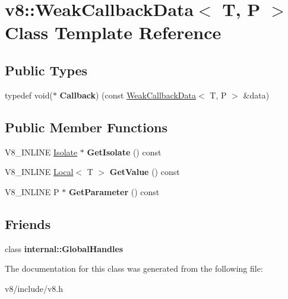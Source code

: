 \hypertarget{classv8_1_1WeakCallbackData}{}\section{v8\+:\+:Weak\+Callback\+Data$<$ T, P $>$ Class Template Reference}
\label{classv8_1_1WeakCallbackData}
\subsection*{Public Types}
\begin{DoxyCompactItemize}
\item 
\hypertarget{classv8_1_1WeakCallbackData_a08a29122f54c663fc2442d8f42c08ac2}{}typedef void($\ast$ {\bfseries Callback}) (const \hyperlink{classv8_1_1WeakCallbackData}{Weak\+Callback\+Data}$<$ T, P $>$ \&data)\label{classv8_1_1WeakCallbackData_a08a29122f54c663fc2442d8f42c08ac2}

\end{DoxyCompactItemize}
\subsection*{Public Member Functions}
\begin{DoxyCompactItemize}
\item 
\hypertarget{classv8_1_1WeakCallbackData_a499a971756182b5b52c28e506339c6b9}{}V8\+\_\+\+I\+N\+L\+I\+N\+E \hyperlink{classv8_1_1Isolate}{Isolate} $\ast$ {\bfseries Get\+Isolate} () const \label{classv8_1_1WeakCallbackData_a499a971756182b5b52c28e506339c6b9}

\item 
\hypertarget{classv8_1_1WeakCallbackData_a0e8fcf0091132c96d548ac319284710a}{}V8\+\_\+\+I\+N\+L\+I\+N\+E \hyperlink{classv8_1_1Local}{Local}$<$ T $>$ {\bfseries Get\+Value} () const \label{classv8_1_1WeakCallbackData_a0e8fcf0091132c96d548ac319284710a}

\item 
\hypertarget{classv8_1_1WeakCallbackData_a96ce7e1fbbfd56d0709225623517ff17}{}V8\+\_\+\+I\+N\+L\+I\+N\+E P $\ast$ {\bfseries Get\+Parameter} () const \label{classv8_1_1WeakCallbackData_a96ce7e1fbbfd56d0709225623517ff17}

\end{DoxyCompactItemize}
\subsection*{Friends}
\begin{DoxyCompactItemize}
\item 
\hypertarget{classv8_1_1WeakCallbackData_af107d8c7663669a5fd39ab41cf5ead03}{}class {\bfseries internal\+::\+Global\+Handles}\label{classv8_1_1WeakCallbackData_af107d8c7663669a5fd39ab41cf5ead03}

\end{DoxyCompactItemize}


The documentation for this class was generated from the following file\+:\begin{DoxyCompactItemize}
\item 
v8/include/v8.\+h\end{DoxyCompactItemize}
